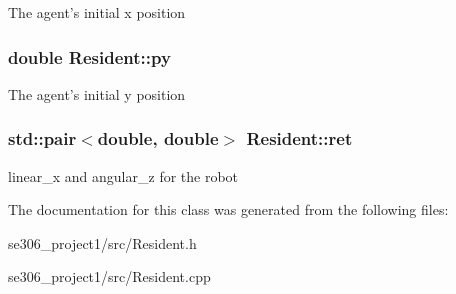 The agent's initial x position \hypertarget{classResident_ac757cac74a1712dd5746d1c3f5702a21}{
\subsubsection[{py}]{\setlength{\rightskip}{0pt plus 5cm}double Resident\-::py\hspace{0.3cm}{\ttfamily [protected]}}}\label{classResident_ac757cac74a1712dd5746d1c3f5702a21}
The agent's initial y position \hypertarget{classResident_a790131eeebec8aed96b90bd1d9ce7fef}{
\subsubsection[{ret}]{\setlength{\rightskip}{0pt plus 5cm}std\-::pair$<$double, double$>$ Resident\-::ret\hspace{0.3cm}{\ttfamily [protected]}}}\label{classResident_a790131eeebec8aed96b90bd1d9ce7fef}
linear\-\_\-x and angular\-\_\-z for the robot 

The documentation for this class was generated from the following files\-:\begin{DoxyCompactItemize}
\item 
se306\-\_\-project1/src/Resident.\-h\item 
se306\-\_\-project1/src/Resident.\-cpp\end{DoxyCompactItemize}
